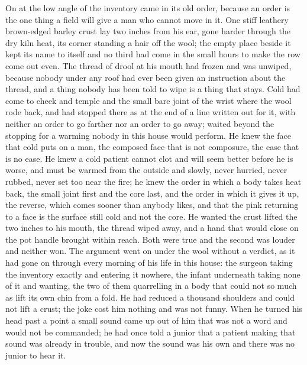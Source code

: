 On  at the low angle of  the inventory came in its old order, because an order is the one thing a field will give a man who cannot move in it. One stiff leathery brown-edged barley crust lay two inches from his ear, gone harder through the dry kiln heat, its corner standing a hair off the wool; the empty place beside it kept its name to itself and no third had come in the small hours to make the row come out even. The thread of drool at his mouth had frozen and was unwiped, because nobody under any roof had ever been given an instruction about the thread, and a thing nobody has been told to wipe is a thing that stays. Cold had come to cheek and temple and the small bare joint of the wrist where the wool rode back, and had stopped there as at the end of a line written out for it, with neither an order to go farther nor an order to go away;  waited beyond the stopping for a warming nobody in this house would perform. He knew the face that cold puts on a man, the composed face that is not composure, the ease that is no ease. He knew a cold patient cannot clot and will seem better before he is worse, and must be warmed from the outside and slowly, never hurried, never rubbed, never set too near the fire; he knew the order in which a body takes heat back, the small joint first and the core last, and the order in which it gives it up, the reverse, which comes sooner than anybody likes, and that the pink returning to a face is the surface still cold and not the core. He wanted the crust lifted the two inches to his mouth, the thread wiped away, and a hand that would close on the pot handle brought within reach. Both were true and the second was louder and neither won. The argument went on under the wool without a verdict, as it had gone on through every morning of his life in this house: the surgeon taking the inventory exactly and entering it nowhere, the infant underneath taking none of it and wanting, the two of them quarrelling in a body that could not so much as lift its own chin from a fold. He had reduced a thousand shoulders and could not lift a crust; the joke cost him nothing and was not funny. When he turned his head past a point a small sound came up out of him that was not a word and would not be commanded; he had once told a junior that a patient making that sound was already in trouble, and now the sound was his own and there was no junior to hear it.

